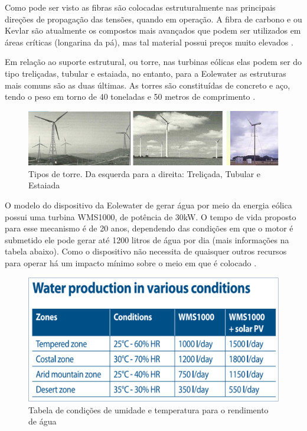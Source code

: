 Como pode ser visto as fibras são colocadas estruturalmente nas principais direções de propagação das tensões, quando 
em operação. A fibra de carbono e ou Kevlar são atualmente os compostos mais avançados que podem ser utilizados em áreas
críticas (longarina da pá), mas tal material possui preços muito elevados \cite{barrosVarela}.  

Em relação ao suporte estrutural, ou torre, nas turbinas eólicas elas podem ser do tipo treliçadas, tubular e estaiada,
no entanto, para a Eolewater as estruturas mais comuns são as duas últimas. As torres são constituídas de concreto e aço,
tendo o peso em torno de 40 toneladas e 50 metros de comprimento \cite{usp}.

\begin{figure}[!htb]
\centering
\includegraphics[scale=0.80]{editaveis/figuras/torre}
\caption[Tipos de torre]{Tipos de torre. Da esquerda para a direita: Treliçada, Tubular e Estaiada \footnotemark}
\FloatBarrier
\label{torre}
\end{figure}

O modelo do dispositivo da Eolewater de gerar água por meio da energia eólica possui uma turbina WMS1000, de potência de 30kW.
O tempo de vida proposto para esse mecanismo é de 20 anos, dependendo das condições em que o motor é submetido ele pode gerar
até 1200 litros de água por dia (mais informações na tabela abaixo). Como o dispositivo não necessita de quaisquer outros 
recursos para operar há um impacto mínimo sobre o meio em que é colocado \cite{renewable}.

\begin{figure}[!htbp]
\centering
\includegraphics[scale=0.3]{editaveis/figuras/condicoes}
\caption[Tabela de condições de umidade e temperatura para o rendimento de água]{Tabela de condições de umidade e temperatura para o rendimento de água \footnotemark}
\FloatBarrier
\label{condicoes}
\end{figure}

